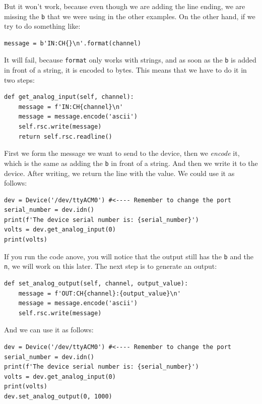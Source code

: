 But it won't work, because even though we are adding the line ending, we are missing the \texttt{b} that we were using in the other examples. On the other hand, if we try to do something like:

\begin{verbatim}
message = b'IN:CH{}\n'.format(channel)
\end{verbatim}

It will fail, because \texttt{format} only works with strings, and as soon as the \texttt{b} is added in front of a string, it is encoded to bytes. This means that we have to do it in two steps:

\begin{verbatim}
def get_analog_input(self, channel):
    message = f'IN:CH{channel}\n'
    message = message.encode('ascii')
    self.rsc.write(message)
    return self.rsc.readline()
\end{verbatim}

First we form the message we want to send to the device, then we \emph{encode} it, which is the same as adding the \texttt{b} in front of a string. And then we write it to the device. After writing, we return the line with the value. We could use it as follows:

\begin{verbatim}
dev = Device('/dev/ttyACM0') #<---- Remember to change the port
serial_number = dev.idn()
print(f'The device serial number is: {serial_number}')
volts = dev.get_analog_input(0)
print(volts)
\end{verbatim}

If you run the code anove, you will notice that the output still has the \texttt{b} and the \texttt{\\n}, we will work on this later. The next step is to generate an output:

\begin{verbatim}
def set_analog_output(self, channel, output_value):
    message = f'OUT:CH{channel}:{output_value}\n'
    message = message.encode('ascii')
    self.rsc.write(message)
\end{verbatim}

And we can use it as follows:

\begin{verbatim}
dev = Device('/dev/ttyACM0') #<---- Remember to change the port
serial_number = dev.idn()
print(f'The device serial number is: {serial_number}')
volts = dev.get_analog_input(0)
print(volts)
dev.set_analog_output(0, 1000)
\end{verbatim}

